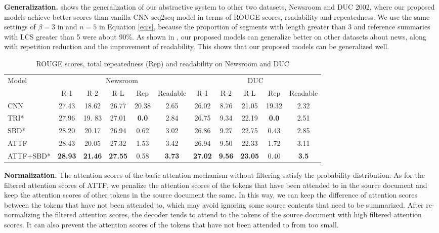 \textbf{Generalization.} 
 shows the generalization of our abstractive system to other two datasets, Newsroom and DUC 2002, where our
proposed models achieve better scores than vanilla CNN seq2seq model in terms of ROUGE scores, readability and repeatedness. 
We use the same settings of $\beta=3$ in  and $n=5$ in Equation \eqref{eq:s}, because the proportion of segments with length greater than 3 and reference summaries with LCS greater than 5 were about 90\%. As shown in , our proposed models can generalize better on other datasets about news, along with repetition reduction and the improvement of readability.
This shows that our proposed models can be generalized well.
\begin{table}[th!]
	\begin{center}
		\caption{ROUGE scores, total repeatedness (Rep) and readability on Newsroom and DUC}
		\begin{tabular}{lcccccccccc}
			\toprule[1pt]
			\multirow{2}{*}{Model} & \multicolumn{5}{c}{Newsroom} &\multicolumn{5}{c}{DUC} \\
			\cmidrule[1pt](lr){2-6} \cmidrule[1pt]{7-11}
			&R-1 & R-2 & R-L& Rep & Readable &R-1 & R-2 & R-L & Rep & Readable\\
			\cmidrule[1pt]{1-11}
			CNN &  27.43 & 18.62 & 26.77 & 20.38 & 2.65 & 26.02 & 8.76 & 21.05& 19.32 & 2.32 \\
			TRI* &  27.96 & 19. 83 & 27.01 & \bf 0.0 & 2.84 & 26.75 & 9.34 & 22.19& \bf 0.0 & 2.51 \\
            SBD* &  28.20 & 20.17 & 26.94 & 0.62 & 3.02 & 26.86 & 9.27 & 22.75& 0.43 & 2.85 \\
            ATTF &  28.43 & 20.05 & 27.32 & 1.53 & 3.42 & 26.94 & 9.50 & 22.33& 1.72 & 3.11 \\
			ATTF+SBD* &  \bf 28.93& \bf 21.46 & \bf 27.55 & 0.58 & \bf 3.73 & \bf 27.02 & \bf 9.56 & \bf 23.05& 0.40 & \bf 3.5 \\
			\bottomrule[1pt]
		\end{tabular}
		\label{tab:generalization}
	\end{center}
\end{table}

\textbf{Normalization.} The attention scores of the basic attention mechanism without filtering satisfy the probability distribution. 
As for the filtered attention scores of ATTF, we penalize the attention scores of the tokens that have been attended to in the source document and keep the attention scores of other tokens in the source document the same. In this way, we can keep the difference of attention scores between the tokens that have not been attended to, which may avoid ignoring some source contents that need to be summarized.
After re-normalizing the filtered attention scores, 
the decoder tends to attend to the tokens of the source document with high filtered attention scores. It can also prevent the attention scores of the tokens that have not been attended to from too small.

